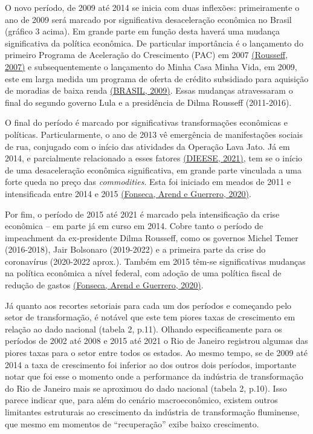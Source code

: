 O novo período, de 2009 até 2014 se inicia com duas inflexões:
primeiramente o ano de 2009 será marcado por significativa desaceleração
econômica no Brasil (gráfico 3 acima). Em grande parte em função desta
haverá uma mudança significativa da política econômica. De particular
importância é o lançamento do primeiro Programa de Aceleração do
Crescimento (PAC) em 2007
\href{https://www.zotero.org/google-docs/?2jrHE4}{(Rousseff, 2007)} e
subsequentemente o lançamento do Minha Casa Minha Vida, em 2009, este em
larga medida um programa de oferta de crédito subsidiado para aquisição
de moradias de baixa renda
\href{https://www.zotero.org/google-docs/?lpgneb}{(BRASIL, 2009)}. Essas
mudanças atravessaram o final do segundo governo Lula e a presidência de
Dilma Rousseff (2011-2016).

O final do período é marcado por significativas transformações
econômicas e políticas. Particularmente, o ano de 2013 vê emergência de
manifestações sociais de rua, conjugado com o início das atividades da
Operação Lava Jato. Já em 2014, e parcialmente relacionado a esses
fatores \href{https://www.zotero.org/google-docs/?baledF}{(DIEESE,
2021)}, tem se o início de uma desaceleração econômica significativa, em
grande parte vinculada a uma forte queda no preço das
\emph{commodities}. Esta foi iniciado em meados de 2011 e intensificada
entre 2014 e 2015
\href{https://www.zotero.org/google-docs/?sPw1rR}{(Fonseca, Arend e
Guerrero, 2020)}.

Por fim, o período de 2015 até 2021 é marcado pela intensificação da
crise econômica -- em parte já em curso em 2014. Cobre tanto o período
de impeachment da ex-presidente Dilma Rousseff, como os governos Michel
Temer (2016-2018), Jair Bolsonaro (2019-2022) e a primeira parte da
crise do coronavírus (2020-2022 aprox.). Também em 2015 têm-se
significativas mudanças na política econômica a nível federal, com
adoção de uma política fiscal de redução de gastos
\href{https://www.zotero.org/google-docs/?uUV1Vw}{(Fonseca, Arend e
Guerrero, 2020)}.

Já quanto aos recortes setoriais para cada um dos períodos e começando
pelo setor de transformação, é notável que este tem piores taxas de
crescimento em relação ao dado nacional (tabela 2, p.11). Olhando
especificamente para os períodos de 2002 até 2008 e 2015 até 2021 o Rio
de Janeiro registrou algumas das piores taxas para o setor entre todos
os estados. Ao mesmo tempo, se de 2009 até 2014 a taxa de crescimento
foi inferior ao dos outros dois períodos, importante notar que foi esse
o momento onde a performance da indústria de transformação do Rio de
Janeiro mais se aproximou do dado nacional (tabela 2, p.10). Isso parece
indicar que, para além do cenário macroeconômico, existem outros
limitantes estruturais ao crescimento da indústria de transformação
fluminense, que mesmo em momentos de ``recuperação'' exibe baixo
crescimento.

